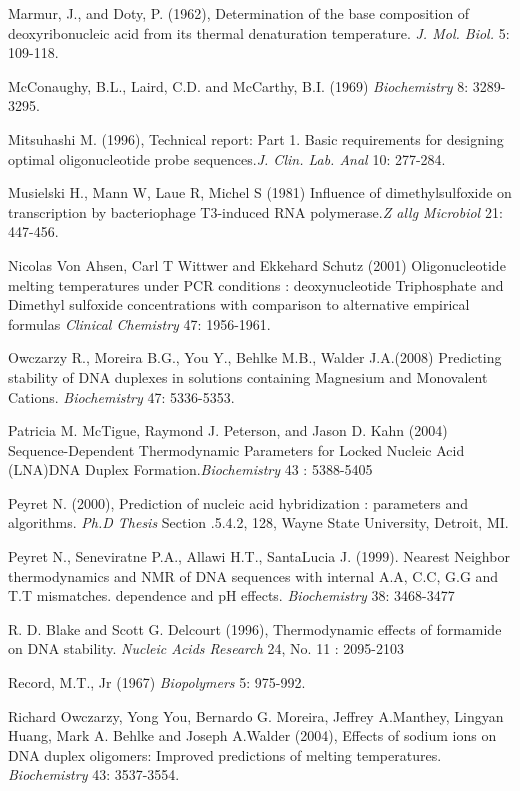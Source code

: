 \documentclass{article}
\begin{document}
Marmur, J., and Doty, P. (1962), Determination of the base composition of deoxyribonucleic 
acid from its thermal denaturation temperature. \textit{J. Mol. Biol.} 5: 109-118.

McConaughy, B.L., Laird, C.D. and McCarthy, B.I. (1969) \textit{ Biochemistry} 8: 3289-3295.

Mitsuhashi M. (1996), Technical report: Part 1. Basic requirements for designing optimal 
oligonucleotide probe sequences.\textit{J. Clin. Lab. Anal} 10: 277-284.

Musielski H., Mann W, Laue R, Michel S (1981) Influence of dimethylsulfoxide on 
transcription by bacteriophage T3-induced RNA polymerase.\textit{Z allg Microbiol}
21: 447-456.

Nicolas Von Ahsen, Carl T Wittwer and Ekkehard Schutz (2001) Oligonucleotide melting 
temperatures under PCR conditions : deoxynucleotide Triphosphate and Dimethyl sulfoxide 
concentrations with comparison to alternative empirical formulas \textit{Clinical Chemistry}
47: 1956-1961.
 
 Owczarzy R., Moreira B.G., You Y., Behlke M.B., Walder J.A.(2008) Predicting stability of DNA duplexes 
 in solutions containing Magnesium and Monovalent Cations. \textit{Biochemistry} 47: 5336-5353.  

Patricia M. McTigue, Raymond J. Peterson, and Jason D. Kahn (2004) Sequence-Dependent 
Thermodynamic Parameters for Locked Nucleic Acid (LNA)DNA Duplex
Formation.\textit{Biochemistry} 
43 : 5388-5405

Peyret N. (2000), Prediction of nucleic acid hybridization : parameters and algorithms.
\textit{Ph.D Thesis} Section .5.4.2, 128, Wayne State University, Detroit, MI.

Peyret N., Seneviratne P.A., Allawi H.T., SantaLucia J. (1999). Nearest Neighbor thermodynamics and 
NMR of DNA sequences with internal A.A, C.C, G.G and T.T mismatches. dependence and pH effects.
\textit{Biochemistry} 38: 3468-3477

R. D. Blake and Scott G. Delcourt (1996), Thermodynamic effects of formamide on DNA stability.
\textit{Nucleic Acids Research} 24, No. 11 : 2095-2103

Record, M.T., Jr (1967) \textit{Biopolymers} 5: 975-992.

Richard Owczarzy, Yong You, Bernardo G. Moreira, Jeffrey A.Manthey, Lingyan Huang, Mark A. 
Behlke and Joseph A.Walder (2004), Effects of sodium ions on DNA duplex oligomers: Improved 
predictions of melting temperatures. \textit{Biochemistry} 43: 3537-3554.
\end{document}
